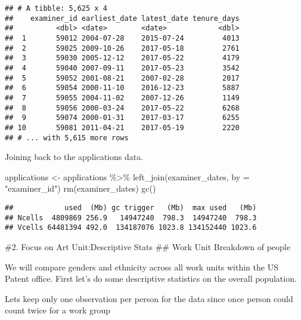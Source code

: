 \documentclass[
]{article}
\newenvironment{Shaded}{\begin{snugshade}}{\end{snugshade}}
\newcommand{\AttributeTok}[1]{\textcolor[rgb]{0.77,0.63,0.00}{#1}}
\newcommand{\FunctionTok}[1]{\textcolor[rgb]{0.00,0.00,0.00}{#1}}
\newcommand{\NormalTok}[1]{#1}
\newcommand{\OtherTok}[1]{\textcolor[rgb]{0.56,0.35,0.01}{#1}}
\newcommand{\SpecialCharTok}[1]{\textcolor[rgb]{0.00,0.00,0.00}{#1}}
\newcommand{\StringTok}[1]{\textcolor[rgb]{0.31,0.60,0.02}{#1}}
\begin{document}
\begin{verbatim}
## # A tibble: 5,625 x 4
##    examiner_id earliest_date latest_date tenure_days
##          <dbl> <date>        <date>            <dbl>
##  1       59012 2004-07-28    2015-07-24         4013
##  2       59025 2009-10-26    2017-05-18         2761
##  3       59030 2005-12-12    2017-05-22         4179
##  4       59040 2007-09-11    2017-05-23         3542
##  5       59052 2001-08-21    2007-02-28         2017
##  6       59054 2000-11-10    2016-12-23         5887
##  7       59055 2004-11-02    2007-12-26         1149
##  8       59056 2000-03-24    2017-05-22         6268
##  9       59074 2000-01-31    2017-03-17         6255
## 10       59081 2011-04-21    2017-05-19         2220
## # ... with 5,615 more rows
\end{verbatim}

Joining back to the applications data.

\begin{Shaded}
\begin{Highlighting}[]
\NormalTok{applications }\OtherTok{\textless{}{-}}\NormalTok{ applications }\SpecialCharTok{\%\textgreater{}\%} 
  \FunctionTok{left\_join}\NormalTok{(examiner\_dates, }\AttributeTok{by =} \StringTok{"examiner\_id"}\NormalTok{)}
\FunctionTok{rm}\NormalTok{(examiner\_dates)}
\FunctionTok{gc}\NormalTok{()}
\end{Highlighting}
\end{Shaded}

\begin{verbatim}
##            used  (Mb) gc trigger   (Mb)  max used   (Mb)
## Ncells  4809869 256.9   14947240  798.3  14947240  798.3
## Vcells 64481394 492.0  134187076 1023.8 134152440 1023.6
\end{verbatim}

\#2. Focus on Art Unit:Descriptive Stats \#\# Work Unit Breakdown of
people

We will compare genders and ethnicity across all work units within the
US Patent office. First let's do some descriptive statistics on the
overall population.

Lets keep only one observation per person for the data since once person
could count twice for a work group
\end{document}
